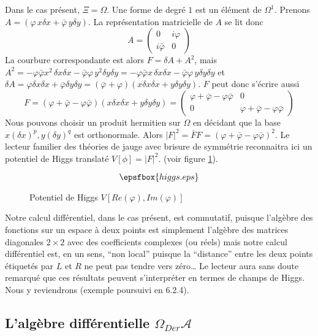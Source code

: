 Dans le cas pr\'esent, $\Xi = \Omega$. Une forme de degr\'e $1$ est un \'el\'ement de
$\Omega^1$. Prenons $A  =  ( \varphi \, x \delta x + \bar  \varphi \,
y \delta y)$. La repr\'esentation matricielle de $A$ se lit donc $$ A
=  \begin{pmatrix} 0 & i  \varphi \\ i \bar  \varphi & 0 \end{pmatrix} $$ 
La courbure correspondante est alors $F  =  \delta A + A^2$, mais $A^2 =
- \varphi \bar  \varphi x^2 \, \delta x \delta x - \bar  \varphi
 \varphi \, y^2 \delta y \delta y =  - \varphi \bar  \varphi x \,
\delta x \delta x - \bar  \varphi
 \varphi \, y \delta y \delta y$ et  $\delta A =  \varphi \delta x
\delta x +  \bar  \varphi  \delta y \delta y = (\bar  \varphi + 
\varphi)(x \delta x \delta x +  y \delta y \delta y)$. $F$ peut 
donc s'\'ecrire aussi
 $$ F =  ( \varphi + \bar  \varphi -  \varphi \bar  \varphi )(x
\delta x \delta x + y \delta y \delta y)
 = \begin{pmatrix}  \varphi + \bar  \varphi -  \varphi \bar  \varphi & 0
\\ 0 &  \varphi + \bar  \varphi -  \varphi \bar  \varphi  \end{pmatrix} $$ 
Nous pouvons choisir un produit hermitien sur $\Omega$ en d\'ecidant que
la base $x(\delta
x)^p,y(\delta y)^q$ est orthonormale. Alors $\vert F \vert^2 = \bar F
F = ( \varphi + \bar
 \varphi -  \varphi \bar  \varphi)^2$. Le lecteur familier des 
 th\'eories de jauge avec brisure de symm\'etrie reconnaitra ici un 
 potentiel de Higgs  translat\'e $V[\phi]  =  \vert F \vert^2$.
 (voir figure \ref{fig:Higgs}).
\begin{figure}[htbp]
\epsfxsize=8cm
$$
    \epsfbox{higgs.eps}
$$
\caption{Potentiel de Higgs $V[Re(\varphi),Im(\varphi)]$}
\label{fig:Higgs}
\end{figure}
 
Notre calcul diff\'erentiel, dans le cas pr\'esent, est commutatif, puisque
l'alg\`ebre des fonctions sur un espace \`a deux points est simplement 
l'alg\`ebre des matrices diagonales $2\times 2$ avec des coefficients 
complexes (ou r\'eels) mais notre calcul diff\'erentiel est, en un sens, 
``non local'' puisque la ``distance'' entre les deux points \'etiquet\'es 
par $L$ et $R$ ne peut pas tendre vers z\'ero\ldots
Le lecteur aura sans doute remarqu\'e que ces r\'esultats peuvent 
s'interpr\'eter en termes de champs de Higgs. Nous y reviendrons 
(exemple poursuivi en 6.2.4).

\subsection{L'alg\`ebre diff\'erentielle $\Omega_{Der}{\mathcal A}$}


